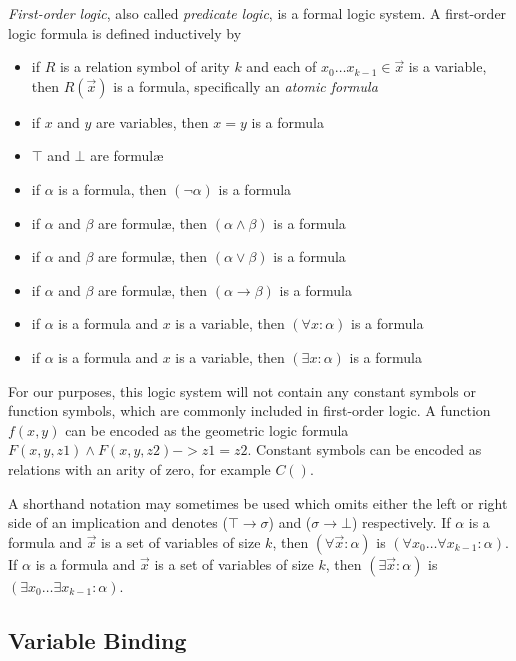 		\emph{First-order logic}, also called \emph{predicate logic}, is a
		formal logic system. A first-order logic formula is defined inductively by
		\begin{itemize}
		\item if $R$ is a relation symbol of arity $k$ and each of $x_0 \ldots x_{k-1} \in \vec{x}$ is a variable, then $R(\vec{x})$ is a formula, specifically an \emph{atomic formula}
		\item if $x$ and $y$ are variables, then $x = y$ is a formula
		\item $\top$ and $\bot$ are formul{\ae}
		\item if $\alpha$ is a formula, then $(\neg\alpha)$ is a formula
		\item if $\alpha$ and $\beta$ are formul{\ae}, then $(\alpha \wedge \beta)$ is a formula
		\item if $\alpha$ and $\beta$ are formul{\ae}, then $(\alpha \vee \beta)$ is a formula
		\item if $\alpha$ and $\beta$ are formul{\ae}, then $(\alpha \to \beta)$ is a formula
		\item if $\alpha$ is a formula and $x$ is a variable, then $(\forall x : \alpha)$ is a formula
		\item if $\alpha$ is a formula and $x$ is a variable, then $(\exists x : \alpha)$ is a formula
		\end{itemize}

		For our purposes, this logic system will not contain any constant
		symbols or function symbols, which are commonly included in first-order
		logic. A function $f(x,y)$ can be encoded as the geometric logic
		formula $F(x,y,z1) \wedge F(x,y,z2) -> z1 = z2$. Constant symbols can
		be encoded as relations with an arity of zero, for example $C()$.

		A shorthand notation may sometimes be used which omits either the left
		or right side of an implication and denotes ($\top \to \sigma$) and
		($\sigma \to \bot$) respectively. If $\alpha$ is a formula and
		$\vec{x}$ is a set of variables of size $k$, then $(\forall \vec{x} :
		\alpha)$ is $(\forall x_0 \ldots \forall x_{k-1} : \alpha)$. If
		$\alpha$ is a formula and $\vec{x}$ is a set of variables of size $k$,
		then $(\exists \vec{x} : \alpha)$ is $(\exists x_0 \ldots \exists
		x_{k-1} : \alpha)$.

	\subsection{Variable Binding}

